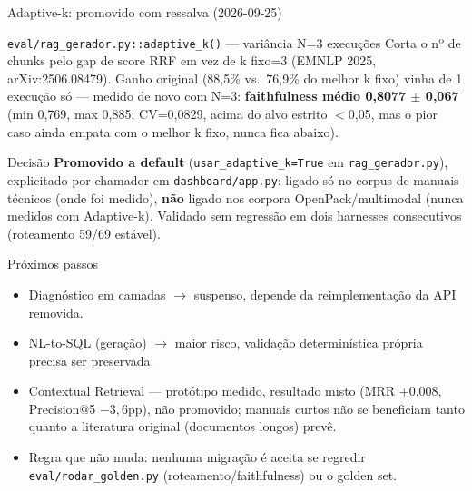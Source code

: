 \documentclass{beamer}
\newenvironment{numerobloco}[1]{\begin{block}{#1}}{\end{block}}
\newenvironment{decisaobloco}[1]{\begin{alertblock}{#1}}{\end{alertblock}}
\begin{document}
\begin{frame}{Adaptive-k: promovido com ressalva (2026-09-25)}
  \small
  \begin{numerobloco}{\texttt{eval/rag\_gerador.py::adaptive\_k()} — variância N=3 execuções}
    Corta o nº de chunks pelo gap de score RRF em vez de k fixo=3 (EMNLP 2025,
    arXiv:2506.08479). Ganho original (88,5\% vs.\ 76,9\% do melhor k fixo) vinha de 1
    execução só — medido de novo com N=3: \textbf{faithfulness médio 0,8077 $\pm$ 0,067}
    (min 0,769, max 0,885; CV=0,0829, acima do alvo estrito $<$0,05, mas o pior caso ainda
    empata com o melhor k fixo, nunca fica abaixo).
  \end{numerobloco}

  \pause
  \begin{decisaobloco}{Decisão}
    \textbf{Promovido a default} (\texttt{usar\_adaptive\_k=True} em
    \texttt{rag\_gerador.py}), explicitado por chamador em \texttt{dashboard/app.py}: ligado
    só no corpus de manuais técnicos (onde foi medido), \textbf{não} ligado nos corpora
    OpenPack/multimodal (nunca medidos com Adaptive-k). Validado sem regressão em dois
    harnesses consecutivos (roteamento 59/69 estável).
  \end{decisaobloco}
\end{frame}

\begin{frame}{Próximos passos}
  \begin{itemize}
    \item Diagnóstico em camadas $\to$ suspenso, depende da reimplementação da API removida.
    \item NL-to-SQL (geração) $\to$ maior risco, validação determinística própria precisa
      ser preservada.
    \item Contextual Retrieval — protótipo medido, resultado misto (MRR +0,008,
      Precision@5 $-3,6$pp), não promovido; manuais curtos não se beneficiam tanto quanto
      a literatura original (documentos longos) prevê.
    \item Regra que não muda: nenhuma migração é aceita se regredir
      \texttt{eval/rodar\_golden.py} (roteamento/faithfulness) ou o golden set.
  \end{itemize}
\end{frame}
\end{document}
